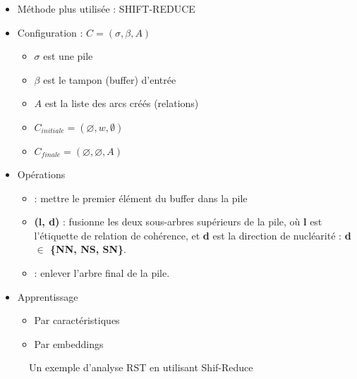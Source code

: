 \documentclass{KodeBook}
\begin{document}
\begin{minipage}{.6\textwidth}
	\begin{itemize}
		\item Méthode plus utilisée : SHIFT-REDUCE
		\item Configuration : $C = (\sigma, \beta, A)$
		\begin{itemize}
			\item $\sigma$ est une pile
			\item $\beta$ est le tampon (buffer) d'entrée
			\item $A$ est la liste des arcs créés (relations)
			\item $C_{initiale} = (\varnothing, w, \emptyset)$
			\item $C_{finale} = (\varnothing, \varnothing, A)$
		\end{itemize}
	\end{itemize}
\end{minipage}
\begin{minipage}{.38\textwidth}
\end{minipage}
\begin{itemize}
	\item Opérations 
	\begin{itemize}
		\item {} : mettre le premier élément du buffer dans la pile
		\item {}\textbf{(l, d)} : fusionne les deux sous-arbres supérieurs de la pile, où \textbf{l} est l'étiquette de relation de cohérence, et \textbf{d} est la direction de nucléarité : \textbf{d $ \in $ \{NN, NS, SN\}}.
		\item {} : enlever l'arbre final de la pile.
	\end{itemize}
	\item Apprentissage 
	\begin{itemize}
		\item Par caractéristiques
		\item Par embeddings
	\end{itemize}
\end{itemize}

\begin{figure}
	
	\caption{Un exemple d'analyse RST en utilisant Shif-Reduce \cite{2018-yu-al}}
\end{figure}
\end{document}
